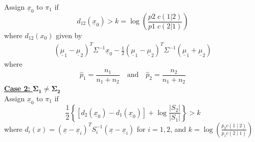 \documentclass[a4paper]{article}
\begin{document}
\begin{multicols*}{4}
Assign $\underline{x}_0$ to $\pi_1$ if
$$
d_{12}\left(\underline{x}_0\right)>k = \log\left(\frac{p2 \; c(1|2)}{p1 \; c(2|1)}\right)
$$
where $d_{12}(x_0)$ given by
$$
\begin{aligned}
\left(\underline{\mu}_1-\underline{\mu}_2\right)^T \Sigma^{-1} \underline{x}_0-\frac{1}{2}\left(\underline{\mu}_1-\underline{\mu}_2\right)^T \Sigma^{-1}\left(\underline{\mu}_1+\underline{\mu}_2\right)
\end{aligned}
$$
where
$$
\hat{p}_1=\frac{n_1}{n_1+n_2} \quad \text{and} \quad \hat{p}_2=\frac{n_2}{n_1+n_2}
$$
\underline{\textbf{Case 2:} $\mathbf{\Sigma_1 \neq \Sigma_2}$} \\

Assign $\underline{x}_0$ to $\pi_1$ if
$$
\frac{1}{2}\left\{\left[d_2\left(\underline{x}_0\right)-d_1\left(\underline{x}_0\right)\right]+\log \frac{\left|S_2\right|}{\left|S_1\right|}\right\}>k
$$
where $d_i(x)=\left(\underline{x}-\underline{x}_i\right)^T S_i^{-1}\left(\underline{x}-\underline{x}_i\right)$ for $i=1,2$, and $k=\log \left(\frac{p_2 c(1 \mid 2)}{p_1 c(2 \mid 1)}\right)$
\smallskip
\end{multicols*}
\end{document}
